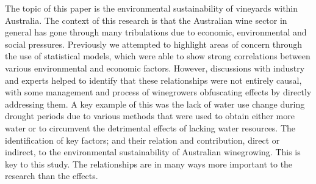
\usepackage{graphicx}
\usepackage{listings}
\usepackage{xcolor}



%


The topic of this paper is the environmental sustainability of vineyards within Australia.
The context of this research is that the Australian wine sector in general has gone through many tribulations due to economic, environmental and social pressures. Previously we attempted to highlight areas of concern through the use of statistical models, which were able to show strong correlations between various environmental and economic factors. However, discussions with industry and experts helped to identify that these relationships were not entirely causal, with some management and process of winegrowers obfuscating effects by directly addressing them. A key example of this was the lack of water use change during drought periods due to various methods that were used to obtain either more water or to circumvent the detrimental effects of lacking water resources.
The identification of key factors; and their relation and contribution, direct or indirect, to the environmental sustainability of Australian winegrowing.
This is key to this study. The relationships are in many ways more important to the research than the effects.





